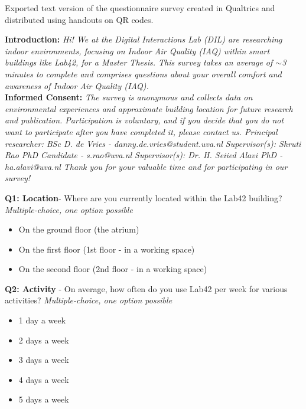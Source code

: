\begin{appendices}
Exported text version of the questionnaire survey created in Qualtrics and distributed using handouts on QR codes.

\vspace{10pt} %

\textbf{Introduction:}
\textit{Hi! We at the Digital Interactions Lab (DIL) are researching indoor environments, focusing on Indoor Air Quality (IAQ) within smart buildings like Lab42, for a Master Thesis. This survey takes an average of $\sim$3 minutes to complete and comprises questions about your overall comfort and awareness of Indoor Air Quality (IAQ).}\\

\textbf{Informed Consent:}
\textit{The survey is anonymous and collects data on environmental experiences and approximate building location for future research and publication. Participation is voluntary, and if you decide that you do not want to participate after you have completed it, please contact us. Principal researcher: BSc D. de Vries - danny.de.vries@student.uva.nl Supervisor(s): Shruti Rao PhD Candidate - s.rao@uva.nl Supervisor(s): Dr. H. Seiied Alavi PhD - ha.alavi@uva.nl Thank you for your valuable time and for participating in our survey!}

\vspace{10pt} %

\textbf{Q1: Location}- Where are you currently located within the Lab42 building? \textit{Multiple-choice, one option possible}

\begin{itemize}
    \item On the ground floor (the atrium)
    \item On the first floor (1st floor - in a working space)
    \item On the second floor (2nd floor - in a working space)
\end{itemize}

\textbf{Q2: Activity} - On average, how often do you use Lab42 per week for various activities? \textit{Multiple-choice, one option possible}

\begin{itemize}
    \item 1 day a week
    \item 2 days a week
    \item 3 days a week
    \item 4 days a week
    \item 5 days a week
\end{itemize}


\end{appendices}
